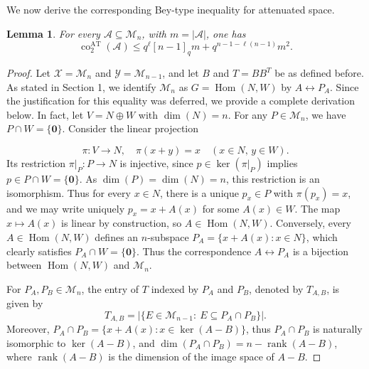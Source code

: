 \documentclass[11pt]{article}
\newtheorem{lemma}{Lemma}
\theoremstyle{definition}
\newcommand{\rank}{\operatorname{rank}}
\newcommand{\Hom}{\operatorname{Hom}}
\begin{document}
We now  derive the corresponding Bey-type inequality for attenuated space.

\begin{lemma}\label{lem:attenuated-bey}
For every $\mathcal A\subseteq\mathcal M_n$, with $m=|\mathcal A|$, one has
\[
\operatorname{co}^{\mathrm{AT}}_2(\mathcal A)
\le q^\ell[n-1]_qm+q^{n-1-\ell(n-1)}m^2.
\]
\end{lemma}

\begin{proof}
Let $\mathscr{X}=\mathcal M_n$ and $\mathscr{Y}=\mathcal M_{n-1}$, and let $B$ and $T=BB^T$ be as defined before. As stated in Section 1, we identify $\mathcal{M}_n$ as $G=\Hom(N,W)$ by $A\leftrightarrow P_A$. Since the justification for this equality was deferred, we provide a complete derivation below. In fact, let $V=N\oplus W$ with $\dim(N)=n$. For any $P \in \mathcal{M}_n$, we have $P \cap W = \{\bm{0}\}$. Consider the linear projection

\[
\pi : V \to N, \quad \pi(x + y) = x \quad (x \in N, \, y \in W).
\]
Its restriction $\pi|_P : P \to N$ is injective, since $p \in \ker(\pi|_P)$ implies $p \in P \cap W = \{\bm{0}\}$. As $\dim(P)=\dim(N)=n$, this restriction is an isomorphism. Thus for every $x \in N$, there is a unique $p_x \in P$ with $\pi(p_x)=x$, and we may write uniquely $p_x = x + A(x)$ for some $A(x) \in W$. The map $x \mapsto A(x)$ is linear by construction, so $A \in \Hom(N,W)$. Conversely, every $A \in \Hom(N,W)$ defines an $n$-subspace $P_A=\{x + A(x): x \in N\}$, which clearly satisfies $P_A \cap W =\{\bm{0}\}$. Thus the correspondence $A \leftrightarrow P_A$ is a bijection between $\Hom(N,W)$ and $\mathcal M_n$. 

For $P_A,P_B\in\mathcal{M}_n$, the entry of $T$ indexed by $P_A$ and $P_B$, denoted by $T_{A,B}$, is given by 
\[
   T_{A,B}=|\{E\in\mathcal{M}_{n-1}:\ E\subseteq P_A\cap P_B\}|. 
\]
Moreover, $P_A\cap P_B=\{x + A(x): x \in \ker(A-B)\}$, thus $P_A\cap P_B$ is naturally isomorphic to $\ker(A-B)$, and $\dim(P_A\cap P_B)=n-\rank(A-B)$, where $\rank(A-B)$ is the dimension of the image space of $A-B$.


\end{proof}
\end{document}
